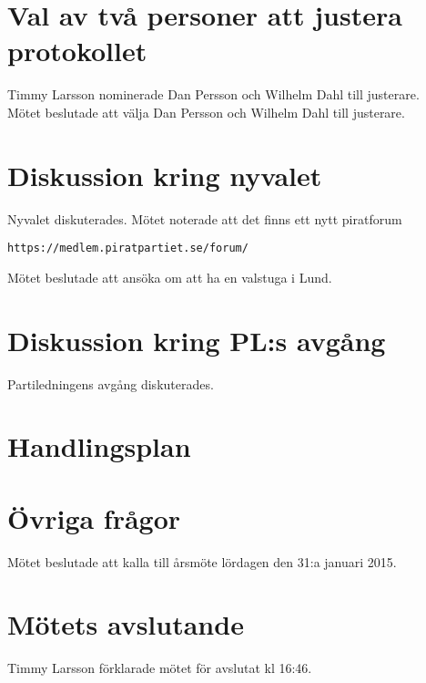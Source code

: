\documentclass[a4paper,10pt]{article}
\begin{document}
\section{Val av två personer att justera protokollet}
Timmy Larsson nominerade Dan Persson och Wilhelm Dahl till justerare.\\
Mötet beslutade att välja Dan Persson och Wilhelm Dahl till justerare.

\section{Diskussion kring nyvalet}
Nyvalet diskuterades. Mötet noterade att det finns ett nytt piratforum 
\begin{verbatim}
https://medlem.piratpartiet.se/forum/
\end{verbatim}
Mötet beslutade att ansöka om att ha en valstuga i Lund.

\section{Diskussion kring PL:s avgång}
Partiledningens avgång diskuterades.

\section{Handlingsplan}


\section{Övriga frågor}
Mötet beslutade att kalla till årsmöte lördagen den 31:a januari 2015.

\section{Mötets avslutande}
Timmy Larsson förklarade mötet för avslutat kl 16:46.
\end{document}
